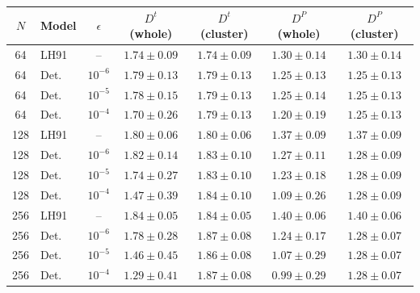 \begin{tabular}{|c|l|c|c|c|c|c|}
\hline
\rowcolor[HTML]{C0C0C0}
$N$ & Model & $\epsilon$ & $D^{t}$ (whole) & $D^{t}$ (cluster) & $D^{P}$ (whole) & $D^{P}$ (cluster) \\ \hline
64 & LH91 & -- & $1.74\pm0.09$ & $1.74\pm0.09$ & $1.30\pm0.14$ & $1.30\pm0.14$ \\
64 & Det. & $10^{-6}$ & $1.79\pm0.13$ & $1.79\pm0.13$ & $1.25\pm0.13$ & $1.25\pm0.13$ \\
64 & Det. & $10^{-5}$ & $1.78\pm0.15$ & $1.79\pm0.13$ & $1.25\pm0.14$ & $1.25\pm0.13$ \\
64 & Det. & $10^{-4}$ & $1.70\pm0.26$ & $1.79\pm0.13$ & $1.20\pm0.19$ & $1.25\pm0.13$ \\
\hline
128 & LH91 & -- & $1.80\pm0.06$ & $1.80\pm0.06$ & $1.37\pm0.09$ & $1.37\pm0.09$ \\
128 & Det. & $10^{-6}$ & $1.82\pm0.14$ & $1.83\pm0.10$ & $1.27\pm0.11$ & $1.28\pm0.09$ \\
128 & Det. & $10^{-5}$ & $1.74\pm0.27$ & $1.83\pm0.10$ & $1.23\pm0.18$ & $1.28\pm0.09$ \\
128 & Det. & $10^{-4}$ & $1.47\pm0.39$ & $1.84\pm0.10$ & $1.09\pm0.26$ & $1.28\pm0.09$ \\
\hline
256 & LH91 & -- & $1.84\pm0.05$ & $1.84\pm0.05$ & $1.40\pm0.06$ & $1.40\pm0.06$ \\
256 & Det. & $10^{-6}$ & $1.78\pm0.28$ & $1.87\pm0.08$ & $1.24\pm0.17$ & $1.28\pm0.07$ \\
256 & Det. & $10^{-5}$ & $1.46\pm0.45$ & $1.86\pm0.08$ & $1.07\pm0.29$ & $1.28\pm0.07$ \\
256 & Det. & $10^{-4}$ & $1.29\pm0.41$ & $1.87\pm0.08$ & $0.99\pm0.29$ & $1.28\pm0.07$ \\
\hline
\end{tabular}
